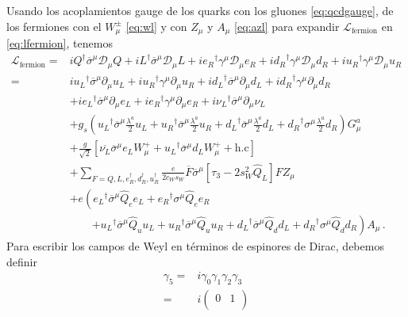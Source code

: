 \begin{frame}
Usando los acoplamientos gauge de los quarks con los gluones \eqref{eq:qcdgauge}, de los fermiones con el $W_\mu^\pm$  \eqref{eq:wl} y  con $Z_\mu$ y $A_\mu$ \eqref{eq:azl} para expandir $\mathcal{L}_{\text{fermion}}$ en \eqref{eq:lfermion}, tenemos
\begin{align}
\label{eq:sm1g2}
 \mathcal{L}_{\text{fermion}}=&i Q^{\dagger}\overline{\sigma}^\mu\mathcal{D}_\mu Q+i L^{\dagger}\overline{\sigma}^\mu\mathcal{D}_\mu L+
i{e_R}^{\dagger}\gamma^\mu\mathcal{D}_\mu {e_R}+i{d_R}^{\dagger}\gamma^\mu\mathcal{D}_\mu {d_R}+i{u_R}^{\dagger}\gamma^\mu\mathcal{D}_\mu {u_R}\nonumber\\
  =&i{u_L}^{\dagger}\overline{\sigma}^\mu\partial_\mu u_L+i{u_R}^{\dagger}\gamma^\mu{\partial}_\mu {u_R}+i{d_L}^{\dagger}\overline{\sigma}^\mu\partial_\mu d_L+i{d_R}^{\dagger}\gamma^\mu{\partial}_\mu {d_R}\nonumber\\
&+i{e_L}^{\dagger}\overline{\sigma}^\mu{\partial}_\mu e_L
+i{e_R}^{\dagger}\gamma^\mu{\partial}_\mu {e_R}+i{\nu_L}^{\dagger}\overline{\sigma}^\mu{\partial}_\mu \nu_L\nonumber\\
&+g_s \left({u_L}^{\dagger}\overline{\sigma}^\mu\frac{\lambda^a}{2}u_L+{u_R}^{\dagger}\overline{\sigma}^{\mu}\frac{\lambda^a}{2}u_R
+{d_L}^{\dagger}\overline{\sigma}^{\mu}\frac{\lambda^a}{2}d_L+ {d_R}^{\dagger}\sigma^{\mu}\frac{\lambda^a}{2}d_R\right)G_{\mu}^a\nonumber\\
&+\frac{g}{\sqrt{2}}\left[\overline{\nu_L}\overline{\sigma}^\mu e_LW_\mu^++
{u_L}^{\dagger}\overline{\sigma}^\mu d_LW_\mu^++\text{h.c}\right]\nonumber\\
&+\sum_{F=Q,L,e_R^{\dagger},d_R^\dagger,u_R^{\dagger}}\frac{e}{2c_W s_W}\overline{F}\overline{\sigma}^\mu\left[ \tau_3-2s_W^2\widehat{Q}_L\right]F Z_\mu\nonumber\\
&+e\left({e_L}^{\dagger}\overline{\sigma}^\mu \widehat{Q}_e e_L+{e_R}^{\dagger}\sigma^\mu \widehat{Q}_e e_R\right.\nonumber\\
  &\qquad\left.+{u_L}^{\dagger}\overline{\sigma}^\mu \widehat{Q}_u u_L+{u_R}^{\dagger}\overline{\sigma}^\mu \widehat{Q}_u u_R
+{d_L}^{\dagger}\overline{\sigma}^\mu \widehat{Q}_d d_L+{d_R}^{\dagger}\sigma^\mu \widehat{Q}_d d_R\right) A_\mu\,.
\end{align}
Para escribir los campos de Weyl en términos de espinores de Dirac, debemos definir
\begin{align}
  \gamma_5=&i\gamma_0\gamma_1\gamma_2\gamma_3 \nonumber\\
=&i
\begin{pmatrix}
0 & 1\\

\end{pmatrix}
\end{align}
\end{frame}
